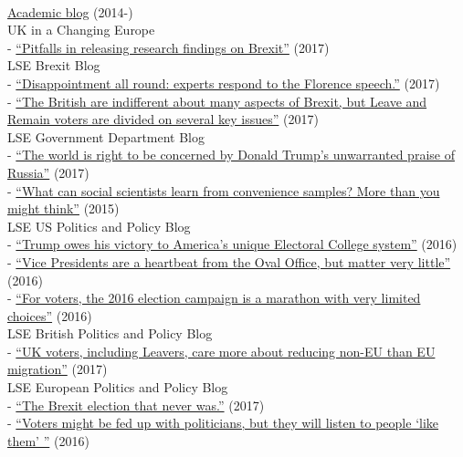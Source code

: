 \documentclass[12pt]{article}
\newcommand{\topic}[1]{\pagebreak[3]\indent {\color{lg}{\footnotesize #1 }}\\}
\newcommand{\entry}[1]{\indent {\color{lg}\guillemotright}\hspace{2pt}#1\vspace{.25em}\\}
\newcommand{\subentry}[1]{{\color{lg}-} #1\vspace{.25em}\\}
\begin{document}
{	\topic{Occasional Blogging}
		\entry{\href{http://thomasleeper.com/blog}{Academic blog} (2014-)}
		\entry{UK in a Changing Europe}
			\subentry{\href{http://ukandeu.ac.uk/pitfalls-in-releasing-research-findings-on-brexit/}{``Pitfalls in releasing research findings on Brexit''} (2017)}
		\entry{LSE Brexit Blog}
			\subentry{\href{http://blogs.lse.ac.uk/brexit/2017/09/22/disappointment-all-round-experts-respond-to-the-florence-speech/}{``Disappointment all round: experts respond to the Florence speech.''} (2017)}
            \subentry{\href{http://blogs.lse.ac.uk/brexit/2017/08/13/the-british-are-indifferent-about-many-aspects-of-brexit-but-leave-and-remain-voters-are-divided-on-several-key-issues/}{``The British are indifferent about many aspects of Brexit, but Leave and Remain voters are divided on several key issues''} (2017)}
		\entry{LSE Government Department Blog}
			\subentry{\href{http://blogs.lse.ac.uk/government/2017/01/09/the-world-is-right-to-be-concerned-by-donald-trumps-unwarranted-praise-of-russia/}{``The world is right to be concerned by Donald Trump's unwarranted praise of Russia''} (2017)}
			\subentry{\href{http://blogs.lse.ac.uk/government/2016/01/14/what-can-social-scientists-learn-from-convenience-samples-more-than-you-might-think/}{``What can social scientists learn from convenience samples? More than you might think''} (2015)}
		\entry{LSE US Politics and Policy Blog}
			\subentry{\href{http://blogs.lse.ac.uk/usappblog/2016/11/10/trump-owes-his-victory-to-americas-unique-electoral-college-system/}{``Trump owes his victory to America's unique Electoral College system''} (2016)}
			\subentry{\href{http://blogs.lse.ac.uk/usappblog/2016/10/05/vice-presidents-are-a-heartbeat-from-the-oval-office-but-matter-very-little/}{``Vice Presidents are a heartbeat from the Oval Office, but matter very little''} (2016)}
			\subentry{\href{http://blogs.lse.ac.uk/usappblog/2016/09/23/for-voters-the-2016-election-campaign-is-a-marathon-with-very-limited-choices/}{``For voters, the 2016 election campaign is a marathon with very limited choices''} (2016)}
		\entry{LSE British Politics and Policy Blog}
			\subentry{\href{http://blogs.lse.ac.uk/politicsandpolicy/non-eu-migration-is-what-uk-voters-care-most-about/}{``UK voters, including Leavers, care more about reducing non-EU than EU migration''} (2017)}
        \entry{LSE European Politics and Policy Blog}
			\subentry{\href{http://blogs.lse.ac.uk/europpblog/2017/06/07/uk-general-election-preview-what-to-look-out-for-as-britain-goes-to-the-polls/}{``The Brexit election that never was.''} (2017)}
            \subentry{\href{http://blogs.lse.ac.uk/europpblog/2016/06/23/voters-listen-people-like-them/}{``Voters might be fed up with politicians, but they will listen to people `like them' ''} (2016)}
}
\end{document}
